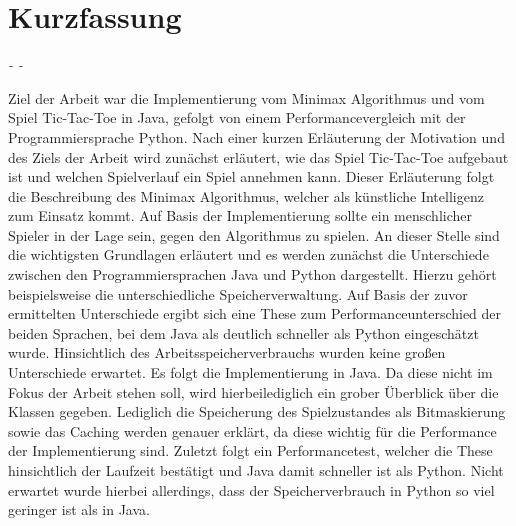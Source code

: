 \chapter*{Kurzfassung}

\begin{flushright}
    \textit{\DerAutorDerArbeit - \DieMatrikelnummer - \DieKursbezeichnung}
\end{flushright}

\textbf{\DerTitelDerArbeit}

Ziel der Arbeit war die Implementierung vom Minimax Algorithmus und vom Spiel Tic-Tac-Toe in Java,
gefolgt von einem Performancevergleich mit der Programmiersprache Python. Nach einer kurzen Erläuterung
der Motivation und des Ziels der Arbeit wird zunächst erläutert, wie das Spiel Tic-Tac-Toe
aufgebaut ist und welchen Spielverlauf ein Spiel annehmen kann. Dieser Erläuterung folgt die
Beschreibung des Minimax Algorithmus, welcher als künstliche Intelligenz zum Einsatz kommt.
Auf Basis der Implementierung sollte ein menschlicher Spieler in der Lage sein, gegen den
Algorithmus zu spielen. An dieser Stelle sind die wichtigsten Grundlagen erläutert und es werden 
zunächst die Unterschiede zwischen den Programmiersprachen Java und Python dargestellt. Hierzu gehört
beispielsweise die unterschiedliche Speicherverwaltung. Auf Basis der zuvor ermittelten Unterschiede
ergibt sich eine These zum Performanceunterschied der beiden Sprachen, bei dem Java als deutlich 
schneller als Python eingeschätzt wurde. Hinsichtlich des Arbeitsspeicherverbrauchs wurden keine großen Unterschiede erwartet.  
Es folgt die Implementierung in Java. Da diese nicht im Fokus der Arbeit stehen soll, wird hierbeilediglich ein grober Überblick über die 
Klassen gegeben. Lediglich die Speicherung des Spielzustandes als Bitmaskierung sowie das Caching werden
genauer erklärt, da diese wichtig für die Performance der Implementierung sind. Zuletzt folgt ein
Performancetest, welcher die These hinsichtlich der Laufzeit bestätigt und Java damit schneller ist als
Python. Nicht erwartet wurde hierbei allerdings, dass der Speicherverbrauch in Python so viel geringer 
ist als in Java.

